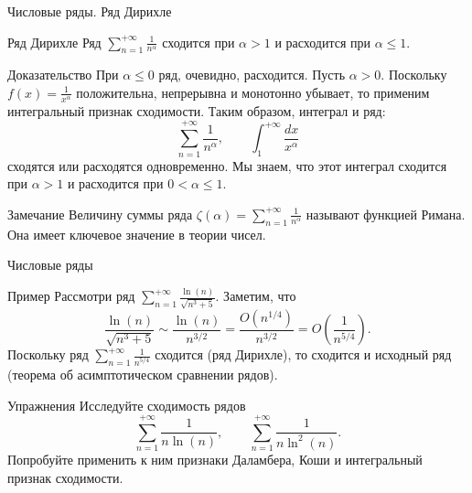 \documentclass[8pt]{beamer}
\begin{document}
\begin{frame}{Числовые ряды. Ряд Дирихле}
\begin{block}{Ряд Дирихле}
Ряд $\displaystyle \sum_{n=1}^{+\infty} \frac{1}{n^\alpha}$ сходится при $\alpha>1$ и расходится при $\alpha\le 1$.
\end{block}
\begin{block}{Доказательство}
При $\alpha\le 0$ ряд, очевидно, расходится. Пусть $\alpha>0$. Поскольку $f(x) = \frac{1}{x^\alpha}$ положительна, непрерывна и монотонно убывает, то применим интегральный признак сходимости. Таким образом, интеграл и ряд:
$$ \sum_{n=1}^{+\infty} \frac{1}{n^\alpha},\qquad \int_1^{+\infty}\frac{dx}{x^\alpha}$$
сходятся или расходятся одновременно. Мы знаем, что этот интеграл сходится при $\alpha>1$ и расходится при $0<\alpha \le 1$.
\end{block}
\begin{block}{Замечание}
Величину суммы ряда $\displaystyle  \zeta(\alpha) =\sum_{n=1}^{+\infty} \frac{1}{n^\alpha}$ называют функцией Римана. Она имеет ключевое значение в теории чисел.
\end{block}
\end{frame}

\begin{frame}{Числовые ряды}
\begin{block}{Пример}
Рассмотри ряд $\displaystyle \sum_{n=1}^{+\infty} \frac{\ln(n)}{\sqrt{n^3+5}}$. Заметим, что
$$\frac{\ln(n)}{\sqrt{n^3+5}} \sim \frac{\ln(n)}{n^{3/2}} =\frac{O(n^{1/4})}{n^{3/2}} = O \left( \frac{1}{n^{5/4}} \right).$$
Поскольку ряд $\displaystyle \sum_{n=1}^{+\infty} \frac{1}{n^{5/4}}$ сходится (ряд Дирихле), то сходится и исходный ряд (теорема об асимптотическом сравнении рядов).
\end{block}
\begin{block}{Упражнения}
Исследуйте сходимость рядов
$$\sum_{n=1}^{+\infty} \frac{1}{n \ln(n)},\qquad 
\sum_{n=1}^{+\infty} \frac{1}{n \ln^2(n)}.$$
Попробуйте применить к ним признаки Даламбера, Коши и интегральный признак сходимости.
\end{block}
\end{frame}
\end{document}

